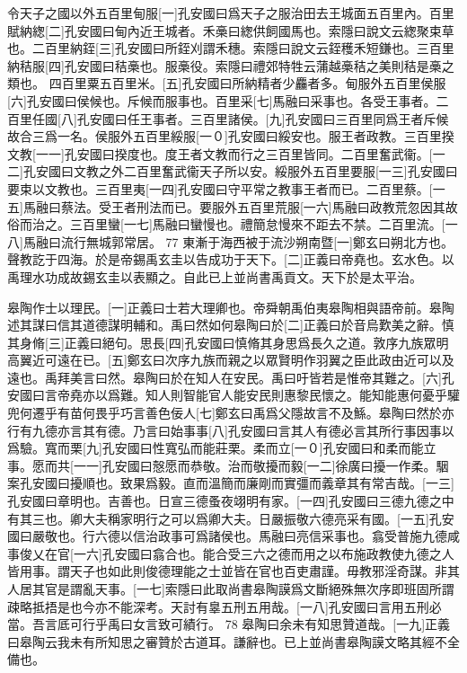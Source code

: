 令天子之國以外五百里甸服[一]孔安國曰爲天子之服治田去王城面五百里內。百里賦納緫[二]孔安國曰甸內近王城者。禾槀曰緫供飼國馬也。索隱曰說文云緫聚束草也。二百里納銍[三]孔安國曰所銍刈謂禾穗。索隱曰說文云銍穫禾短鎌也。三百里納秸服[四]孔安國曰秸槀也。服槀役。索隱曰禮郊特牲云蒲越槀秸之美則秸是槀之類也。 四百里粟五百里米。[五]孔安國曰所納精者少麤者多。甸服外五百里侯服[六]孔安國曰侯候也。斥候而服事也。百里采[七]馬融曰采事也。各受王事者。二百里任國[八]孔安國曰任王事者。三百里諸侯。[九]孔安國曰三百里同爲王者斥候故合三爲一名。侯服外五百里綏服[一０]孔安國曰綏安也。服王者政教。三百里揆文教[一一]孔安國曰揆度也。度王者文教而行之三百里皆同。二百里奮武衞。[一二]孔安國曰文教之外二百里奮武衞天子所以安。綏服外五百里要服[一三]孔安國曰要束以文教也。三百里夷[一四]孔安國曰守平常之教事王者而已。二百里蔡。[一五]馬融曰蔡法。受王者刑法而已。要服外五百里荒服[一六]馬融曰政教荒忽因其故俗而治之。三百里蠻[一七]馬融曰蠻慢也。禮簡怠慢來不距去不禁。二百里流。[一八]馬融曰流行無城郭常居。
77
東漸于海西被于流沙朔南暨[一]鄭玄曰朔北方也。聲教訖于四海。於是帝錫禹玄圭以告成功于天下。[二]正義曰帝堯也。玄水色。以禹理水功成故錫玄圭以表顯之。自此已上並尚書禹貢文。天下於是太平治。

皋陶作士以理民。[一]正義曰士若大理卿也。帝舜朝禹伯夷皋陶相與語帝前。皋陶述其謀曰信其道德謀明輔和。禹曰然如何皋陶曰於[二]正義曰於音烏歎美之辭。慎其身脩[三]正義曰絕句。思長[四]孔安國曰慎脩其身思爲長久之道。敦序九族眾明高翼近可遠在已。[五]鄭玄曰次序九族而親之以眾賢明作羽翼之臣此政由近可以及遠也。禹拜美言曰然。皋陶曰於在知人在安民。禹曰吁皆若是惟帝其難之。[六]孔安國曰言帝堯亦以爲難。知人則智能官人能安民則惠黎民懷之。能知能惠何憂乎驩兜何遷乎有苗何畏乎巧言善色佞人[七]鄭玄曰禹爲父隱故言不及鯀。皋陶曰然於亦行有九德亦言其有德。乃言曰始事事[八]孔安國曰言其人有德必言其所行事因事以爲驗。寬而栗[九]孔安國曰性寬弘而能莊栗。柔而立[一０]孔安國曰和柔而能立事。愿而共[一一]孔安國曰慤愿而恭敬。治而敬擾而毅[一二]徐廣曰擾一作柔。駰案孔安國曰擾順也。致果爲毅。直而溫簡而廉剛而實彊而義章其有常吉哉。[一三]孔安國曰章明也。吉善也。日宣三德蚤夜翊明有家。[一四]孔安國曰三德九德之中有其三也。卿大夫稱家明行之可以爲卿大夫。日嚴振敬六德亮采有國。[一五]孔安國曰嚴敬也。行六德以信治政事可爲諸侯也。馬融曰亮信采事也。翕受普施九德咸事俊乂在官[一六]孔安國曰翕合也。能合受三六之德而用之以布施政教使九德之人皆用事。謂天子也如此則俊德理能之士並皆在官也百吏肅謹。毋教邪淫奇謀。非其人居其官是謂亂天事。[一七]索隱曰此取尚書皋陶謨爲文斷絕殊無次序即班固所謂疎略抵捂是也今亦不能深考。天討有辠五刑五用哉。[一八]孔安國曰言用五刑必當。吾言厎可行乎禹曰女言致可績行。
78
皋陶曰余未有知思贊道哉。[一九]正義曰皋陶云我未有所知思之審贊於古道耳。謙辭也。已上並尚書皋陶謨文略其經不全備也。


